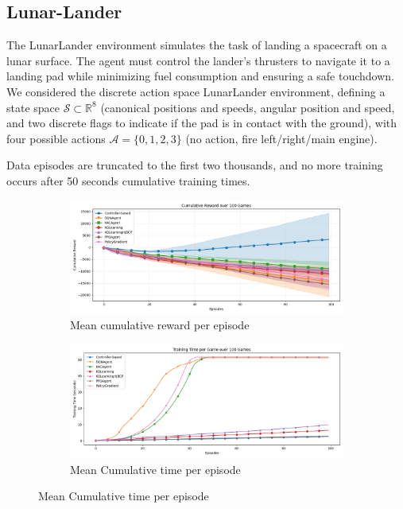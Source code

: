 \documentclass[
]{article}
\numberwithin{equation}{section}
\begin{document}
\hypertarget{Lunar-Lander}{%
\subsection{Lunar-Lander}\label{Lunar-Lander}}


The LunarLander environment simulates the task of landing a spacecraft on a lunar surface. The agent must control the lander's thrusters to navigate it to a landing pad while minimizing fuel consumption and ensuring a safe touchdown. We considered the discrete action space LunarLander environment, defining a state space $\mathcal{S} \subset \mathbb{R}^8$ (canonical positions and speeds, angular position and speed, and two discrete flags to indicate if the pad is in contact with the ground), with four possible actions $\mathcal{A} = \{0,1,2,3\}$ (no action, fire left/right/main engine).

Data episodes are truncated to the first two thousands, and no more training occurs after 50 seconds cumulative training times.

\begin{figure}[!htb]
    \centering
    \begin{subfigure}{0.48\textwidth}
        \centering
        \includegraphics[width=\textwidth]{figs/plot_rewards_LN.png}
        \caption{Mean cumulative reward per episode}
        \label{fig:LNR}
    \end{subfigure}
    \hfill
    \begin{subfigure}{0.48\textwidth}
        \centering
        \includegraphics[width=\textwidth]{figs/plot_times_LN.png}
        \caption{Mean Cumulative time per episode}
        \label{fig:LNT}
    \end{subfigure}
\end{figure}
\end{document}
